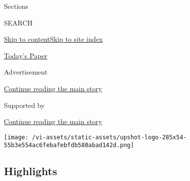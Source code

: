 Sections

SEARCH

\protect\hyperlink{site-content}{Skip to
content}\protect\hyperlink{site-index}{Skip to site index}

\href{https://myaccount.nytimes.com/auth/login?response_type=cookie\&client_id=vi}{}

\href{https://www.nytimes.com/section/todayspaper}{Today's Paper}

Advertisement

\protect\hyperlink{after-top}{Continue reading the main story}

Supported by

\protect\hyperlink{after-sponsor}{Continue reading the main story}

\texttt{[image: /vi-assets/static-assets/upshot-logo-285x54-55b3e554ac6febafebfdb580abad142d.png]}

\hypertarget{highlights}{%
\subsection{Highlights}\label{highlights}}

